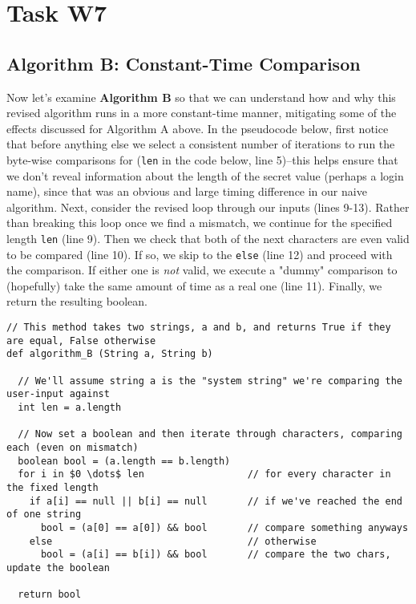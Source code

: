 \documentclass{article}
\providecommand{\inlinecode}{\texttt}
\begin{document}
\section{Task W7}
\subsection{Algorithm B: Constant-Time Comparison}
Now let's examine \textbf{Algorithm B} so that we can understand how and why this revised algorithm runs in a more constant-time manner, mitigating some of the effects discussed for Algorithm A above.
In the pseudocode below, first notice that before anything else we select a consistent number of iterations to run the byte-wise comparisons for (\inlinecode{len} in the code below, line 5)--this helps ensure that we don't reveal information about the length of the secret value (perhaps a login name), since that was an obvious and large timing difference in our naive algorithm.
Next, consider the revised loop through our inputs (lines 9-13). Rather than breaking this loop once we find a mismatch, we continue for the specified length \inlinecode{len} (line 9).
Then we check that both of the next characters are even valid to be compared (line 10). If so, we skip to the \inlinecode{else} (line 12) and proceed with the comparison. If either one is \textit{not} valid, we execute a "dummy" comparison to (hopefully) take the same amount of time as a real one (line 11).
Finally, we return the resulting boolean.

\begin{lstlisting}
// This method takes two strings, a and b, and returns True if they are equal, False otherwise
def algorithm_B (String a, String b)

  // We'll assume string a is the "system string" we're comparing the user-input against
  int len = a.length

  // Now set a boolean and then iterate through characters, comparing each (even on mismatch)
  boolean bool = (a.length == b.length)
  for i in $0 \dots$ len                  // for every character in the fixed length
    if a[i] == null || b[i] == null       // if we've reached the end of one string
      bool = (a[0] == a[0]) && bool       // compare something anyways
    else                                  // otherwise
      bool = (a[i] == b[i]) && bool       // compare the two chars, update the boolean

  return bool
\end{lstlisting}
\end{document}
